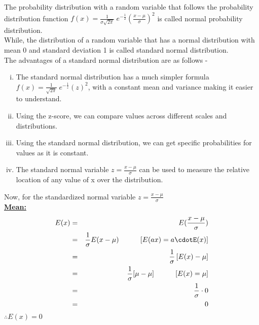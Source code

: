 \documentclass{article}
\begin{document}
\Large{
    The probability distribution with a random variable that follows the probability
    distribution function $f(x) = \frac{1}{\sigma\sqrt{2\pi}}\;e^{-\frac{1}{2}}\left(\frac{x-\mu}{\sigma}\right)^2$ is called normal 
    probability distribution.\\

    While, the distribution of a random variable that has a normal distribution with mean 0 
    and standard deviation 1 is called standard normal distribution.\\

    The advantages of a standard normal distribution are as follows -
    \begin{enumerate}[i)]
        \item The standard normal distribution has a much simpler formula 
            $f(x) = \frac{1}{\sqrt{2\pi}}\;e^{-\frac{1}{z}}(z)^2$, with a constant mean and variance
            making it easier to understand.

        \item Using the z-score, we can compare values across different scales and distributions.

        \item Using the standard normal distribution, we can get specific probabilities for values as it is constant.

        \item The standard normal variable $z=\frac{x-\mu}{\sigma}$ can be used to measure the relative location of any value of x over the distribution.
    \end{enumerate}

    Now, for the standardized normal variable $z=\frac{x-\mu}{\sigma}$\\

    \textbf{\underline{Mean:}}\\
    \begin{eqnarray*}
        E(x) &=& E(\frac{x-\mu}{\sigma})\\
        &=& \frac{1}{\sigma} E(x-\mu)\hspace{1cm}\left[E(ax) = a\cdotE(x)\right]\\
        &=& \frac{1}{\sigma}\left[E(x) - \mu\right]\\
        &=& \frac{1}{\sigma} [\mu-\mu]\hspace{1cm}\left[E(x) = \mu\right]\\
        &=& \frac{1}{\sigma}\cdot 0 \\
        &=& 0
    \end{eqnarray*}
    $\therefore E(x) = 0$\\

}
\end{document}
